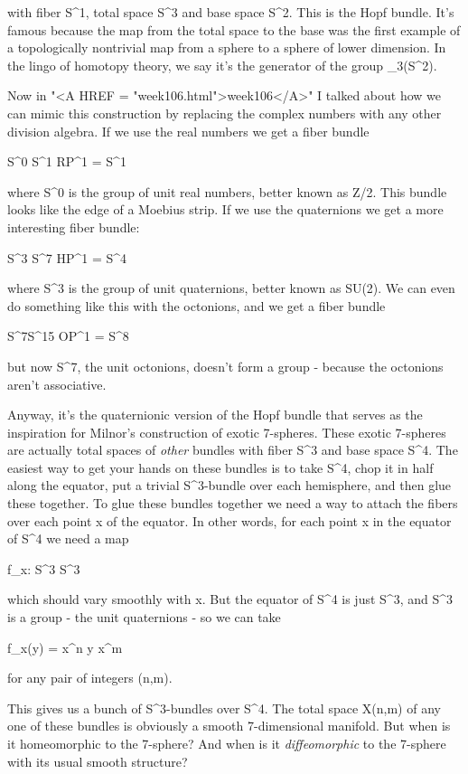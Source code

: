 with fiber S^{1}, total space S^{3} and base space 
S^{2}.  This is the Hopf
bundle.  It's famous because the map from the total space to the base
was the first example of a topologically nontrivial map from a sphere to
a sphere of lower dimension.  In the lingo of homotopy theory, we say
it's the generator of the group \pi _{3}(S^{2}).  

Now in "<A HREF = "week106.html">week106</A>" I talked about how we can mimic this construction by
replacing the complex numbers with any other division algebra.  If we
use the real numbers we get a fiber bundle

S^{0} \to  S^{1} \to  RP^{1} = S^{1}    

where S^{0} is the group of unit real numbers, better known as Z/2.  
This 
bundle looks like the edge of a Moebius strip.  If we use the quaternions 
we get a more interesting fiber bundle:

S^{3} \to  S^{7} \to  HP^{1} = S^{4}

where S^{3} is the group of unit quaternions, better known as SU(2).  
We can even do something like this with the octonions, and we get a fiber
bundle

S^{7}\to  S^{15} \to  OP^{1} = S^{8}

but now S^{7}, the unit octonions, doesn't form a group - because the
octonions aren't associative.  

Anyway, it's the quaternionic version of the Hopf bundle that serves as
the inspiration for Milnor's construction of exotic 7-spheres.  These
exotic 7-spheres are actually total spaces of \emph{other} bundles with fiber
S^{3} and base space S^{4}.  The easiest way to get your 
hands on these
bundles is to take S^{4}, chop it in half along the equator, put a 
trivial
S^{3}-bundle over each hemisphere, and then glue these together.  
To glue
these bundles together we need a way to attach the fibers over each
point x of the equator.  In other words, for each point x in the equator
of S^{4} we need a map 

f_{x}: S^{3} \to  S^{3}

which should vary smoothly with x.  But the equator of S^{4} 
is just S^{3}, and
S^{3} is a group - the unit quaternions - so we can take

f_{x}(y) = x^{n} y x^{m}

for any pair of integers (n,m).  

This gives us a bunch of S^{3}-bundles over S^{4}.
The total space X(n,m) of any one of these bundles is obviously a smooth
7-dimensional manifold.  But when is it homeomorphic to the 7-sphere?
And when is it \emph{diffeomorphic} to the 7-sphere with its usual
smooth structure?

